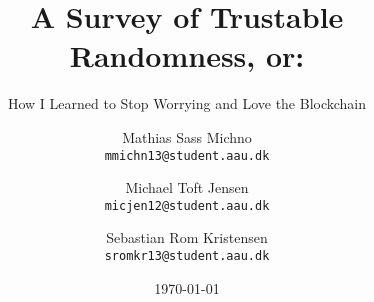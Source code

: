 \newcommand{\TITLE}{A Survey of Trustable Randomness, or:}
\newcommand{\SUBTITLE}{How I Learned to Stop Worrying and Love the Blockchain}
\newcommand{\GROUP}{deis923e17}
\newcommand{\PERIOD}{Fall semester, 2017}
\newcommand{\MEMBERS}{%
    Mathias Sass Michno\\
    Michael Toft Jensen\\
    Sebastian Rom Kristensen
}
\newcommand{\SUPERVISOR}{Stefan Schmid}
\newcommand{\COMPLETION}{January 12, 2017}

\title{\TITLE}
\subtitle{\SUBTITLE}
\author{
    Mathias Sass Michno\\
    \texttt{mmichn13@student.aau.dk}
    \and
    Michael Toft Jensen\\
    \texttt{micjen12@student.aau.dk}
    \and
    Sebastian Rom Kristensen\\
    \texttt{sromkr13@student.aau.dk}
}
\date{\today}
